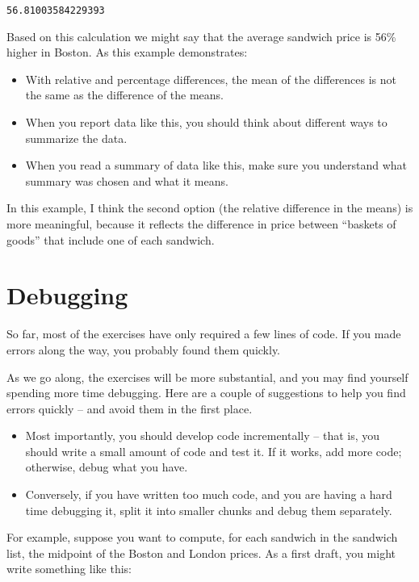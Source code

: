 \begin{lstlisting}[style=output]
56.81003584229393
\end{lstlisting}

Based on this calculation we might say that the average sandwich price
is 56\% higher in Boston. As this example demonstrates:

\begin{itemize}
\item
  With relative and percentage differences, the mean of the differences
  is not the same as the difference of the means.
\item
  When you report data like this, you should think about different ways
  to summarize the data.
\item
  When you read a summary of data like this, make sure you understand
  what summary was chosen and what it means.
\end{itemize}

In this example, I think the second option (the relative difference in
the means) is more meaningful, because it reflects the difference in
price between ``baskets of goods'' that include one of each sandwich.

\section{Debugging}\label{debugging}

So far, most of the exercises have only required a few lines of code. If
you made errors along the way, you probably found them quickly.

As we go along, the exercises will be more substantial, and you may find
yourself spending more time debugging. Here are a couple of suggestions
to help you find errors quickly -- and avoid them in the first place.

\begin{itemize}
\item
  Most importantly, you should develop code incrementally -- that is,
  you should write a small amount of code and test it. If it works, add
  more code; otherwise, debug what you have.
\item
  Conversely, if you have written too much code, and you are having a
  hard time debugging it, split it into smaller chunks and debug them
  separately.
\end{itemize}

For example, suppose you want to compute, for each sandwich in the
sandwich list, the midpoint of the Boston and London prices. As a first
draft, you might write something like this:

